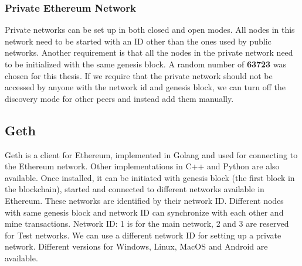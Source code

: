 \documentclass[11pt,openright]{report}
\begin{document}
\subsubsection{Private Ethereum Network}
Private networks can be set up in both closed and open modes. All nodes in this network need to be started with an ID other than the ones used by public networks. Another requirement is that all the nodes in the private network need to be initialized with the same genesis block. A random number of \textbf{63723} was chosen for this thesis. If we require that the private network should not be accessed by anyone with the network id and genesis block, we can turn off the discovery mode for other peers and instead add them manually.

\subsection{Geth}
Geth is a client for Ethereum, implemented in Golang and used for connecting to the Ethereum network. Other implementations in C++ and Python are also available. Once installed, it can be initiated with genesis block (the first block in the blockchain), started and connected to different networks available in Ethereum. These networks are identified by their network ID. Different nodes with same genesis block and network ID can synchronize with each other and mine transactions. Network ID: 1 is for the main network, 2 and 3 are reserved for Test networks. We can use a different network ID for setting up a private network. Different versions for Windows, Linux, MacOS and Android are available.
\end{document}
